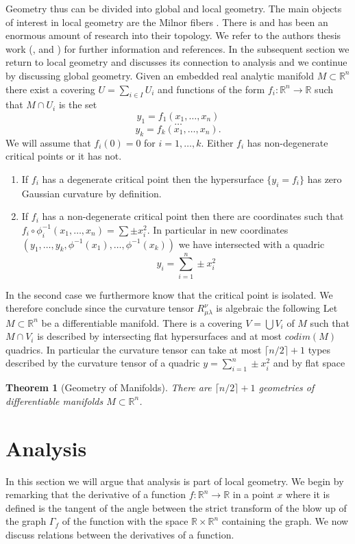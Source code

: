 \documentclass[10pt,a4paper]{amsart}
\newtheorem{theorem}{Theorem}
\begin{document}
Geometry thus can be divided into global and local geometry. The main objects of interest in local geometry are the Milnor fibers \cite{Milnor}. There is and has been an enormous amount of research into their topology. We refer to the authors thesis work (\cite{LarsI}, \cite{LarsII} and \cite{LarsIII}) for further information and references. In the subsequent section we return to local geometry and discusses its connection to analysis and we continue by discussing global geometry. Given an embedded real analytic manifold $M\subset\mathbb{R}^n$ there exist a covering $U=\sum_{i\in I} U_i$ and functions of the form $f_i: \mathbb{R}^{n}\to \mathbb{R}$ such that $M\cap U_i$ is the set
$$y_1=f_1(x_1,\dots, x_n)$$
$$\dots$$
$$y_k=f_k(x_1,\dots, x_n).$$
We will assume that $f_i(0)=0$ for $i=1,\dots, k$. Either $f_i$ has non-degenerate critical points or it has not.

\begin{enumerate}
    \item If $f_i$ has a degenerate critical point then 
    the hypersurface $\{y_i=f_i\}$ has zero Gaussian curvature by definition. 
    \item If $f_i$ has a non-degenerate critical point then there are coordinates such that $f_i\circ \phi_i^{-1}(x_1,\dots, x_n)=\sum \pm x_i^2$. In particular in new coordinates $(y_1,\dots, y_k, \phi^{-1}(x_1),\dots, \phi^{-1}(x_k))$ we have intersected with a quadric
    $$y_i=\sum_{i=1}^n \pm x_i^2$$
\end{enumerate}

In the second case we furthermore know that the critical point is isolated. We therefore conclude since the curvature tensor $R_{\mu\lambda}^{\nu}$ is algebraic the following
    Let $M\subset \mathbb{R}^n$ be a differentiable manifold. There is a covering $V=\bigcup V_i$ of $M$ such that $M\cap V_i$ is described by intersecting flat hypersurfaces and at most $codim (M)$ quadrics.
    In particular the curvature tensor can take at most $\lceil n/2\rceil +1$ types described by the curvature tensor of a quadric $y=\sum_{i=1}^n \pm x_i^2$ and by flat space

\begin{theorem}[Geometry of Manifolds] There are $\lceil n/2\rceil + 1$ geometries of differentiable manifolds $M\subset \mathbb{R}^n$. 
\end{theorem}


\section{Analysis}
In this section we will argue that analysis is part of local geometry. We begin by remarking that the derivative of a function $f:\mathbb{R}^n\to \mathbb{R}$ in a point $x$ where it is defined is the tangent of the angle between the strict transform of the blow up of the graph $\Gamma_f$ of the function with the space $\mathbb{R}\times \mathbb{R}^n$ containing the graph. We now discuss relations between the derivatives of a function.\\
\end{document}
